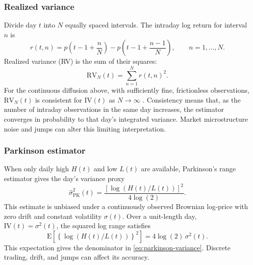 \documentclass[12pt,a4paper]{article}
\numberwithin{equation}{section}
\numberwithin{table}{section}
\numberwithin{figure}{section}
\begin{document}
\subsubsection{Realized variance}
Divide day $t$ into $N$ equally spaced intervals. The intraday log return for interval $n$ is
\begin{equation}\label{eq:intraday-log-return}
r(t,n)=p\!\left(t-1+\frac{n}{N}\right)-p\!\left(t-1+\frac{n-1}{N}\right),\qquad n=1,\ldots,N.
\end{equation}
Realized variance (RV) is the sum of their squares:
\begin{equation}\label{eq:realized-variance}
\mathrm{RV}_N(t)=\sum_{n=1}^{N}r(t,n)^2.
\end{equation}
For the continuous diffusion above, with sufficiently fine, frictionless observations, $\mathrm{RV}_N(t)$ is consistent for $\mathrm{IV}(t)$ as $N\to\infty$ \cite{andersen1998,reisenhofer2022}. Consistency means that, as the number of intraday observations in the same day increases, the estimator converges in probability to that day's integrated variance. Market microstructure noise and jumps can alter this limiting interpretation.

\subsubsection{Parkinson estimator}
When only daily high $H(t)$ and low $L(t)$ are available, Parkinson's range estimator gives the day's variance proxy
\begin{equation}\label{eq:parkinson-variance}
\widehat\sigma^2_{\mathrm{PK}}(t)=\frac{\left[\log\!\left(H(t)/L(t)\right)\right]^2}{4\log(2)}.
\end{equation}
This estimate is unbiased under a continuously observed Brownian log-price with zero drift and constant volatility $\sigma(t)$. Over a unit-length day, $\mathrm{IV}(t)=\sigma^2(t)$, the squared log range satisfies \cite{parkinson1980}
\begin{equation}\label{eq:parkinson-range-moment}
\mathrm E\!\left[\left\{\log\!\left(H(t)/L(t)\right)\right\}^{2}\right]
=4\log(2)\,\sigma^2(t).
\end{equation}
This expectation gives the denominator in \eqref{eq:parkinson-variance}. Discrete trading, drift, and jumps can affect its accuracy.
\end{document}
